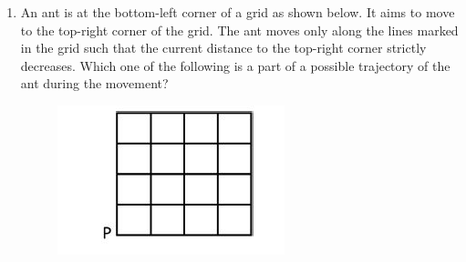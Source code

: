 \documentclass[journal,12pt,onecolumn]{IEEEtran}
\theoremstyle{remark}
\begin{document}
\begin{enumerate}
\item An ant is at the bottom-left corner of a grid  as shown below. It aims to move to the top-right corner of the grid. The ant moves only along the lines marked in the grid such that the current distance to the top-right corner strictly decreases. Which one of the following is a part of a possible trajectory of the ant during the movement?

\hfill{}


\begin{figure}[H]
\centering

\includegraphics[width = 0.4\columnwidth]{figs/q10.png}
\caption*{}
\label{fig:q10}
\end{figure}

\begin{multicols}{2}
\begin{enumerate}


\end{enumerate}
\end{multicols}
\end{enumerate}
\end{document}

